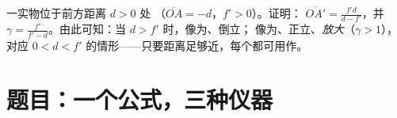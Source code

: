 \begin{exercise}[$\star\star\star$]\label{exo:g11:lenses-and-eye:15}
一实物位于前方距离 $d > 0$ 处
（$\overline{OA} = -d$，$f' > 0$）。证明：
$\overline{OA'} = \frac{f'd}{d - f'}$，并
$\gamma = \frac{f'}{f' - d}$。由此可知：当 $d > f'$ 时，像为、倒立；
像为、正立、\emph{放大}（$\gamma > 1$），
对应 $0 < d < f'$ 的情形——只要距离足够近，每个都可用作。
\end{exercise}

\section{题目：一个公式，三种仪器}

